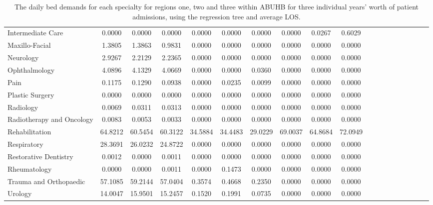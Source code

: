 \documentclass[thesis.tex]{subfiles}
\begin{document}
\begin{landscape}
\begin{table}[h!]
{\begin{tabular}{lcccccccccccccccccc}
Intermediate Care&	0.0000&	0.0000&	0.0000&	0.0000&	0.0000&	0.0000&	0.0000&	0.0267&	0.6029\\
Maxillo-Facial&	1.3805&	1.3863&	0.9831&	0.0000&	0.0000&	0.0000&	0.0000&	0.0000&	0.0000\\
Neurology &	2.9267&	2.2129&	2.2365&	0.0000&	0.0000&	0.0000&	0.0000&	0.0000&	0.0000\\
Ophthalmology &	4.0896&	4.1329&	4.0669&	0.0000&	0.0000&	0.0360&	0.0000&	0.0000&	0.0000\\
Pain &	0.1175&	0.1290&	0.0938&	0.0000&	0.0235&	0.0099&	0.0000&	0.0000&	0.0000\\
Plastic Surgery&	0.0000&	0.0000&	0.0000&	0.0000&	0.0000&	0.0000&	0.0000&	0.0000&	0.0000\\
Radiology &	0.0069&	0.0311&	0.0313&	0.0000&	0.0000&	0.0000&	0.0000&	0.0000&	0.0000\\
Radiotherapy and Oncology&	0.0083&	0.0053&	0.0033&	0.0000&	0.0000&	0.0000&	0.0000&	0.0000&	0.0000\\
Rehabilitation &	64.8212&	60.5454&	60.3122&	34.5884&	34.4483&	29.0229&	69.0037&	64.8684&	72.0949\\
Respiratory &	28.3691&	26.0232&	24.8722&	0.0000&	0.0000&	0.0000&	0.0000&	0.0000&	0.0000\\
Restorative Dentistry&	0.0012&	0.0000&	0.0011&	0.0000&	0.0000&	0.0000&	0.0000&	0.0000&	0.0000\\
Rheumatology &	0.0000&	0.0000&	0.0011&	0.0000&	0.1473&	0.0000&	0.0000&	0.0000&	0.0000\\
Trauma and Orthopaedic&	57.1085&	59.2144&	57.0404&	0.3574&	0.4668&	0.2350&	0.0000&	0.0000&	0.0000\\
Urology &	14.0047&	15.9501&	15.2457&	0.1520&	0.1991&	0.0735&	0.0000&	0.0000&	0.0000\\
\bottomrule
\end{tabular}  } 
\caption{The daily bed demands for each specialty for regions one, two and three within ABUHB for three individual years’ worth of patient admissions, using the regression tree and average LOS.}
    \label{apptab:LinkedDemands2a}
\end{table}

\begin{table}[h!]
    \centering{}
\end{table}
\end{landscape}
\end{document}
